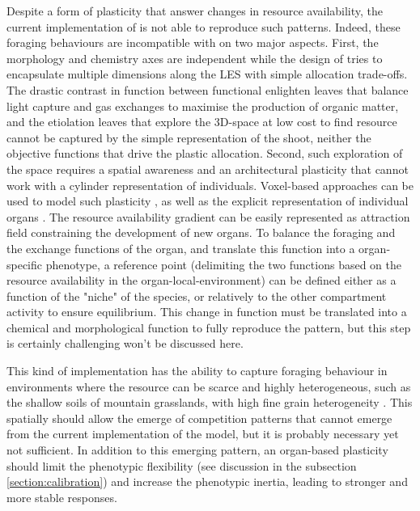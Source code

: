 Despite a form of plasticity that answer changes in resource availability, the current implementation of \model is not able to reproduce such patterns. Indeed, these foraging behaviours are incompatible with \model on two major aspects. First, the morphology and chemistry axes are independent \parencite{mitchell_intraspecific_2014} while the design of \model tries to encapsulate multiple dimensions along the LES with simple allocation trade-offs. The drastic contrast in function between functional enlighten leaves that balance light capture and gas exchanges to maximise the production of organic matter, and the etiolation leaves that explore the 3D-space at low cost to find resource cannot be captured by the simple representation of the shoot, neither the objective functions that drive the plastic allocation. Second, such exploration of the space requires a spatial awareness and an architectural plasticity that cannot work with a cylinder representation of individuals. Voxel-based approaches can be used to model such plasticity \parencite{reineking_environmental_2006}, as well as the explicit representation of individual organs \parencite{vos_functionalstructural_2010}. The resource availability gradient can be easily represented as attraction field constraining the development of new organs. To balance the foraging and the exchange functions of the organ, and translate this function into a organ-specific phenotype, a reference point (delimiting the two functions based on the resource availability in the organ-local-environment) can be defined either as a function of the "niche" of the species, or relatively to the other compartment activity to ensure equilibrium. This change in function must be translated into a chemical and morphological function to fully reproduce the pattern, but this step is certainly challenging won't be discussed here.

This kind of implementation has the ability to capture foraging behaviour in environments where the resource can be scarce and highly heterogeneous, such as the shallow soils of mountain grasslands, with high fine grain heterogeneity \parencite{reineking_environmental_2006, deleglise_heterogeneite_2011}. This spatially should allow the emerge of competition patterns that cannot emerge from the current implementation of the model, but it is probably necessary yet not sufficient. In addition to this emerging pattern, an organ-based plasticity should limit the phenotypic flexibility (see discussion in the subsection \ref{section:calibration}) and increase the phenotypic inertia, leading to stronger and more stable responses.

